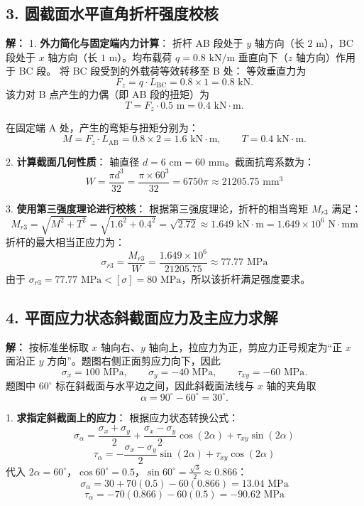 \documentclass[11pt,a4paper]{ctexrep}
\begin{document}
{\subsection*{3. 圆截面水平直角折杆强度校核}
\textbf{解：}
1. \textbf{外力简化与固定端内力计算}：
折杆 AB 段处于 $y$ 轴方向（长 $2\text{ m}$），BC 段处于 $x$ 轴方向（长 $1\text{ m}$）。均布载荷 $q = 0.8\text{ kN/m}$ 垂直向下（$z$ 轴方向）作用于 BC 段。
将 BC 段受到的外载荷等效转移至 B 处：
等效垂直力为
\[
F_z = q \cdot L_{\mathrm{BC}} = 0.8 \times 1 = 0.8\text{ kN}.
\]
该力对 B 点产生的力偶（即 AB 段的扭矩）为
\[
T = F_z \cdot 0.5\text{ m} = 0.4\text{ kN}\cdot\text{m}.
\]

在固定端 A 处，产生的弯矩与扭矩分别为：
\[
M = F_z \cdot L_{\mathrm{AB}} = 0.8 \times 2 = 1.6\text{ kN}\cdot\text{m},
\qquad
T = 0.4\text{ kN}\cdot\text{m}.
\]

2. \textbf{计算截面几何性质}：
轴直径 $d = 6\text{ cm} = 60\text{ mm}$。截面抗弯系数为：
\[
W = \frac{\pi d^3}{32} = \frac{\pi \times 60^3}{32} = 6750\pi \approx 21205.75\text{ mm}^3
\]

3. \textbf{使用第三强度理论进行校核}：
根据第三强度理论，折杆的相当弯矩 $M_{r3}$ 满足：
\[
M_{r3} = \sqrt{M^2 + T^2} = \sqrt{1.6^2 + 0.4^2} = \sqrt{2.72} \approx 1.649\text{ kN}\cdot\text{m} = 1.649 \times 10^6\text{ N}\cdot\text{mm}
\]
折杆的最大相当正应力为：
\[
\sigma_{r3} = \frac{M_{r3}}{W} = \frac{1.649 \times 10^6}{21205.75} \approx 77.77\text{ MPa}
\]
由于 $\sigma_{r3} = 77.77\text{ MPa} < [\sigma] = 80\text{ MPa}$，所以该折杆满足强度要求。

\subsection*{4. 平面应力状态斜截面应力及主应力求解}
\textbf{解：}
按标准坐标取 $x$ 轴向右、$y$ 轴向上，拉应力为正，剪应力正号规定为“正 $x$ 面沿正 $y$ 方向”。题图右侧正面剪应力向下，因此
\[
\sigma_x = 100\text{ MPa},\qquad \sigma_y = -40\text{ MPa},\qquad \tau_{xy}=-60\text{ MPa}.
\]
题图中 $60^\circ$ 标在斜截面与水平边之间，因此斜截面法线与 $x$ 轴的夹角取
\[
\alpha = 90^\circ-60^\circ=30^\circ .
\]

1. \textbf{求指定斜截面上的应力}：
根据应力状态转换公式：
\[
\sigma_\alpha = \frac{\sigma_x + \sigma_y}{2} + \frac{\sigma_x - \sigma_y}{2}\cos(2\alpha) + \tau_{xy}\sin(2\alpha)
\]
\[
\tau_\alpha = -\frac{\sigma_x - \sigma_y}{2}\sin(2\alpha) + \tau_{xy}\cos(2\alpha)
\]
代入 $2\alpha = 60^\circ$，$\cos60^\circ=0.5$，$\sin60^\circ=\frac{\sqrt{3}}{2}\approx0.866$：
\[
\sigma_{\alpha} = 30 + 70(0.5) - 60(0.866)
=13.04\text{ MPa}
\]
\[
\tau_{\alpha} = -70(0.866) - 60(0.5)
=-90.62\text{ MPa}
\]

}
\end{document}
